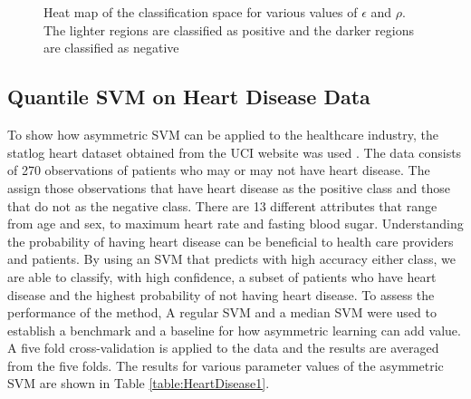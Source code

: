 \documentclass[twoside,11pt]{article}
\begin{document}
\begin{figure}[htp]
  \begin{center}
     \\
     \\
  \end{center}
  \caption{Heat map of the classification space for various values of $\epsilon$ and $\rho$. The lighter regions are classified as positive and the darker regions are classified as negative}
  \label{fig:edge}
\end{figure}



\subsection{Quantile SVM on Heart Disease Data}
To show how asymmetric SVM can be applied to the healthcare industry, the statlog heart dataset obtained from the UCI website was used \citep{Frank10}. The data consists of 270 observations of patients who may or may not have heart disease. The assign those observations that have heart disease as the positive class and those that do not as the negative class. There are 13 different attributes that range from age and sex, to maximum heart rate and fasting blood sugar. Understanding the probability of having heart disease can be beneficial to health care providers and patients. By using an SVM that predicts with high accuracy either class, we are able to classify, with high confidence, a subset of patients who have heart disease and the highest probability of not having heart disease. To assess the performance of the method, A regular SVM and a median SVM were used to establish a benchmark and a baseline for how asymmetric learning can add value. A five fold cross-validation is applied to the data and the results are averaged from the five folds. The results for various parameter values of the asymmetric SVM are shown in Table \ref{table:HeartDisease1}. 
\end{document}
